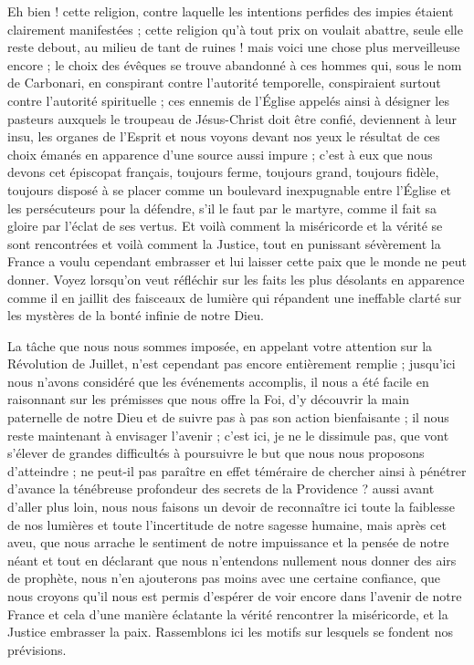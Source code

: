 \documentclass[11pt,a4paper]{report}
\begin{document}
Eh bien ! cette religion, contre laquelle les intentions perfides des impies étaient clairement manifestées ; cette religion qu'à tout prix on voulait abattre, seule elle reste debout, au milieu de tant de ruines ! mais voici une chose plus merveilleuse encore ; le choix des évêques se trouve abandonné à ces hommes qui, sous le nom de Carbonari, en conspirant contre l'autorité temporelle, conspiraient surtout contre l'autorité spirituelle ; ces ennemis de l'Église appelés ainsi à désigner les pasteurs auxquels le troupeau de Jésus-Christ doit être confié, deviennent à leur insu, les organes de l'Esprit et nous voyons devant nos yeux le résultat de ces choix émanés en apparence d'une source aussi impure ; c'est à eux que nous devons cet épiscopat français, toujours ferme, toujours grand, toujours fidèle, toujours disposé à se placer comme un boulevard inexpugnable entre l'Église et les persécuteurs pour la défendre, s'il le faut par le martyre, comme il fait sa gloire par l'éclat de ses vertus. Et voilà comment la miséricorde et la vérité se sont rencontrées et voilà comment la Justice, tout en punissant sévèrement la France a voulu cependant embrasser et lui laisser cette paix que le monde ne peut donner. Voyez lorsqu'on veut réfléchir sur les faits les plus désolants en apparence comme il en jaillit des faisceaux de lumière qui répandent une ineffable clarté sur les mystères de la bonté infinie de notre Dieu.

La tâche que nous nous sommes imposée, en appelant votre attention sur la Révolution de Juillet, n'est cependant pas encore entièrement remplie ; jusqu'ici nous n'avons considéré que les événements accomplis, il nous a été facile en raisonnant sur les prémisses que nous offre la Foi, d'y découvrir la main paternelle de notre Dieu et de suivre pas à pas son action bienfaisante ; il nous reste maintenant à envisager l'avenir ; c'est ici, je ne le dissimule pas, que vont s'élever de grandes difficultés à poursuivre le but que nous nous proposons d'atteindre ; ne peut-il pas paraître en effet téméraire de chercher ainsi à pénétrer d'avance la ténébreuse profondeur des secrets de la Providence ? aussi avant d'aller plus loin, nous nous faisons un devoir de reconnaître ici toute la faiblesse de nos lumières et toute l'incertitude de notre sagesse humaine, mais après cet aveu, que nous arrache le sentiment de notre impuissance et la pensée de notre néant et tout en déclarant que nous n'entendons nullement nous donner des airs de prophète, nous n'en ajouterons pas moins avec une certaine confiance, que nous croyons qu'il nous est permis d'espérer de voir encore dans l'avenir de notre France et cela d'une manière éclatante la vérité rencontrer la miséricorde, et la Justice embrasser la paix. Rassemblons ici les motifs sur lesquels se fondent nos prévisions.
\end{document}
